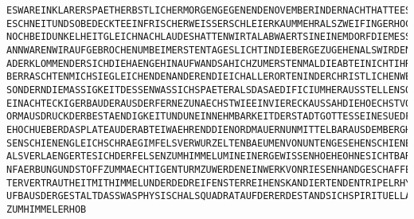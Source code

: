 \begin{verbatim}
ESWAREINKLARERSPAETHERBSTLICHERMORGENGEGENENDENOVEMBERINDERNACHTHATTEESEINWENIGG
ESCHNEITUNDSOBEDECKTEEINFRISCHERWEISSERSCHLEIERKAUMMEHRALSZWEIFINGERHOCHDENBODEN
NOCHBEIDUNKELHEITGLEICHNACHLAUDESHATTENWIRTALABWAERTSINEINEMDORFDIEMESSEGEHOERTD
ANNWARENWIRAUFGEBROCHENUMBEIMERSTENTAGESLICHTINDIEBERGEZUGEHENALSWIRDENSTEILENPF
ADERKLOMMENDERSICHDIEHAENGEHINAUFWANDSAHICHZUMERSTENMALDIEABTEINICHTIHREMAUERNUE
BERRASCHTENMICHSIEGLEICHENDENANDERENDIEICHALLERORTENINDERCHRISTLICHENWELTGESEHEN
SONDERNDIEMASSIGKEITDESSENWASSICHSPAETERALSDASAEDIFICIUMHERAUSSTELLENSOLLTEESWAR
EINACHTECKIGERBAUDERAUSDERFERNEZUNAECHSTWIEEINVIERECKAUSSAHDIEHOECHSTVOLLENDETEF
ORMAUSDRUCKDERBESTAENDIGKEITUNDUNEINNEHMBARKEITDERSTADTGOTTESSEINESUEDFLANKERAGT
EHOCHUEBERDASPLATEAUDERABTEIWAEHRENDDIENORDMAUERNUNMITTELBARAUSDEMBERGHANGZUWACH
SENSCHIENENGLEICHSCHRAEGIMFELSVERWURZELTENBAEUMENVONUNTENGESEHENSCHIENESGERADEZU
ALSVERLAENGERTESICHDERFELSENZUMHIMMELUMINEINERGEWISSENHOEHEOHNESICHTBARENWANDELI
NFAERBUNGUNDSTOFFZUMMAECHTIGENTURMZUWERDENEINWERKVONRIESENHANDGESCHAFFENINGROESS
TERVERTRAUTHEITMITHIMMELUNDERDEDREIFENSTERREIHENSKANDIERTENDENTRIPELRHYTHMUSDESA
UFBAUSDERGESTALTDASSWASPHYSISCHALSQUADRATAUFDERERDESTANDSICHSPIRITUELLALSDREIECK
ZUMHIMMELERHOB
\end{verbatim}

